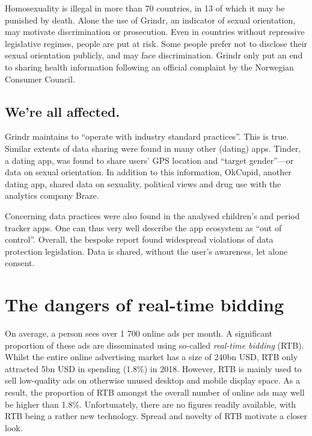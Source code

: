 \documentclass[
]{book}
\begin{document}
Homosexuality is illegal in more than 70 countries, in 13 of which it may be punished by death. Alone the use of Grindr, an indicator of sexual orientation, may motivate discrimination or prosecution. Even in countries without repressive legislative regimes, people are put at risk. Some people prefer not to disclose their sexual orientation publicly, and may face discrimination. Grindr only put an end to sharing health information following an official complaint by the Norwegian Consumer Council.

\hypertarget{were-all-affected.}{%
\subsection{We're all affected.}\label{were-all-affected.}}

Grindr maintains to ``operate with industry standard practices''. This is true. Similar extents of data sharing were found in many other (dating) apps. Tinder, a dating app, was found to share users' GPS location and ``target gender''---or data on sexual orientation. In addition to this information, OkCupid, another dating app, shared data on sexuality, political views and drug use with the analytics company Braze.

Concerning data practices were also found in the analysed children's and period tracker apps. One can thus very well describe the app ecosystem as ``out of control''. Overall, the bespoke report found widespread violations of data protection legislation. Data is shared, without the user's awareness, let alone consent.

\hypertarget{the-dangers-of-real-time-bidding}{%
\section{The dangers of real-time bidding}\label{the-dangers-of-real-time-bidding}}

On average, a person sees over 1 700 online ads per month. A significant proportion of these ads are disseminated using so-called \emph{real-time bidding} (RTB). Whilst the entire online advertising market has a size of 240bn USD, RTB only attracted 5bn USD in spending (1.8\%) in 2018. However, RTB is mainly used to sell low-quality ads on otherwise unused desktop and mobile display space. As a result, the proportion of RTB amongst the overall number of online ads may well be higher than 1.8\%. Unfortunately, there are no figures readily available, with RTB being a rather new technology. Spread and novelty of RTB motivate a closer look.
\end{document}
